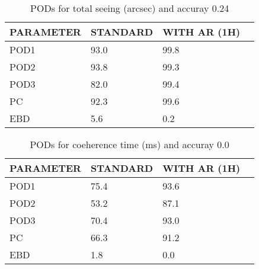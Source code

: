 \documentclass[11pt,english]{article}
\begin{document}
\begin{table}[]
\begin{center}
\begin{tabular}{|l|l|l|l|}
\hline
\multicolumn{1}{|c|}{\cellcolor[HTML]{C0C0C0}\textbf{PARAMETER}} & \multicolumn{1}{c|}{\cellcolor[HTML]{C0C0C0}\textbf{STANDARD}} & \multicolumn{1}{c|}{\cellcolor[HTML]{C0C0C0}\textbf{WITH AR (1H)}} \\
\hline
\cellcolor[HTML]{C0C0C0}POD1  & 93.0                                & 99.8         \\
\cellcolor[HTML]{C0C0C0}POD2  & 93.8                                & 99.3         \\
\cellcolor[HTML]{C0C0C0}POD3  & 82.0                                & 99.4         \\
\cellcolor[HTML]{C0C0C0}PC    & 92.3                                  & 99.6           \\
\cellcolor[HTML]{C0C0C0}EBD   & 5.6                                 & 0.2          \\
\hline
\end{tabular}
\caption{PODs for total seeing (arcsec) and accuray 0.24}
\end{center}
\end{table}
\begin{table}[]
\begin{center}
\begin{tabular}{|l|l|l|l|}
\hline
\multicolumn{1}{|c|}{\cellcolor[HTML]{C0C0C0}\textbf{PARAMETER}} & \multicolumn{1}{c|}{\cellcolor[HTML]{C0C0C0}\textbf{STANDARD}} & \multicolumn{1}{c|}{\cellcolor[HTML]{C0C0C0}\textbf{WITH AR (1H)}} \\
\hline
\cellcolor[HTML]{C0C0C0}POD1  & 75.4                                & 93.6         \\
\cellcolor[HTML]{C0C0C0}POD2  & 53.2                                & 87.1         \\
\cellcolor[HTML]{C0C0C0}POD3  & 70.4                                & 93.0         \\
\cellcolor[HTML]{C0C0C0}PC    & 66.3                                  & 91.2           \\
\cellcolor[HTML]{C0C0C0}EBD   & 1.8                                 & 0.0          \\
\hline
\end{tabular}
\caption{PODs for coeherence time (ms) and accuray 0.0}
\end{center}
\end{table}
\end{document}
